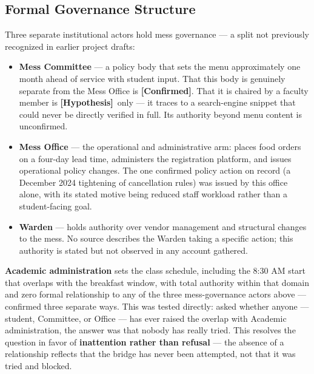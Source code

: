 \documentclass[11pt]{article}
\newcommand{\confirmed}{\textbf{[Confirmed]}}
\newcommand{\hypo}{\textbf{[Hypothesis]}}
\begin{document}
\subsection{Formal Governance Structure}

Three separate institutional actors hold mess governance --- a split not previously
recognized in earlier project drafts:

\begin{itemize}
    \item \textbf{Mess Committee} --- a policy body that sets the menu approximately
        one month ahead of service with student input. That this body is genuinely
        separate from the Mess Office is \confirmed. That it is chaired by a faculty
        member is \hypo\ only --- it traces to a search-engine snippet that could
        never be directly verified in full. Its authority beyond menu content is
        unconfirmed.
    \item \textbf{Mess Office} --- the operational and administrative arm: places
        food orders on a four-day lead time, administers the registration platform,
        and issues operational policy changes. The one confirmed policy action on
        record (a December 2024 tightening of cancellation rules) was issued by this
        office alone, with its stated motive being reduced staff workload rather than
        a student-facing goal.
    \item \textbf{Warden} --- holds authority over vendor management and structural
        changes to the mess. No source describes the Warden taking a specific action;
        this authority is stated but not observed in any account gathered.
\end{itemize}

\textbf{Academic administration} sets the class schedule, including the 8:30 AM start
that overlaps with the breakfast window, with total authority within that domain and
zero formal relationship to any of the three mess-governance actors above ---
confirmed three separate ways. This was tested directly: asked whether anyone ---
student, Committee, or Office --- has ever raised the overlap with Academic
administration, the answer was that nobody has really tried. This resolves the
question in favor of \textbf{inattention rather than refusal} --- the absence of a
relationship reflects that the bridge has never been attempted, not that it was tried
and blocked.
\end{document}
